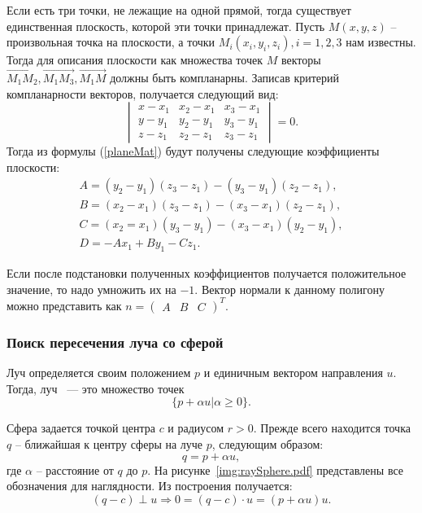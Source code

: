 Если есть три точки, не лежащие на одной прямой, тогда существует единственная плоскость, которой эти точки принадлежат. Пусть $M(x,y,z)$ -- произвольная точка на плоскости, а точки $M_i(x_i, y_i, z_i), i = 1, 2, 3$ нам известны. Тогда для описания плоскости как множества точек $M$ векторы $\overrightarrow{M_1M_2}, \overrightarrow{M_1M_3}, \overrightarrow{M_1M}$ должны быть компланарны. Записав критерий компланарности векторов, получается следующий вид:
\begin{equation}
	\label{planeMat}
	\begin{vmatrix}
		x - x_1 & x_2 - x_1 & x_3 - x_1 \\
		y - y_1 & y_2 - y_1 & y_3 - y_1 \\
		z - z_1 & z_2 - z_1 & z_3 - z_1
	\end{vmatrix} = 0.
\end{equation}
Тогда из формулы (\ref{planeMat}) будут получены следующие коэффициенты плоскости:
\begin{gather}
	A = (y_2 - y_1)(z_3 - z_1) - (y_3 - y_1)(z_2 - z_1),\\
	B = (x_2 - x_1)(z_3 - z_1) - (x_3 - x_1)(z_2 - z_1),\\
	C = (x_2 = x_1)(y_3 - y_1) - (x_3 - x_1)(y_2 - y_1),\\
	D = -Ax_1 + By_1 - Cz_1.
\end{gather}

Если после подстановки полученных коэффициентов получается положительное значение, то надо умножить их на $-1$. Вектор нормали к данному полигону можно представить как $n = \begin{pmatrix} A & B & C \end{pmatrix}^T$. 

\subsubsection{Поиск пересечения луча со сферой}
Луч определяется своим положением $p$ и единичным вектором направления $u$. Тогда, луч~\cite{ray_sphere} --- это множество точек 
\begin{equation}
	\{p + \alpha u |\alpha \geq 0\}.
\end{equation}

Сфера задается точкой центра $c$ и радиусом $r > 0$. Прежде всего находится точка $q$ -- ближайшая к центру сферы на луче $p$, следующим образом:
\begin{equation}
	\label{sph2}
	q = p + \alpha u,
\end{equation} 
где $\alpha$ -- расстояние от $q$ до $p$.
На рисунке~\ref{img:raySphere.pdf} представлены все обозначения для наглядности.
Из построения получается:
\begin{equation}
	\label{sph1}
	(q-c) \perp u \Rightarrow 0 = (q-c) \cdot u = (p+\alpha u)u.
\end{equation}

